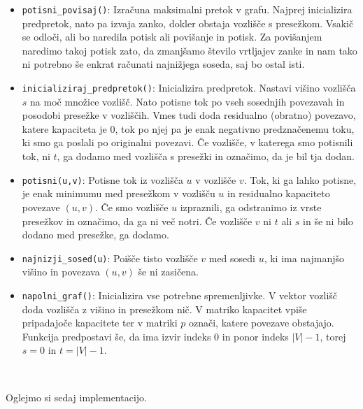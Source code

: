 \documentclass[mat1]{fmfdelo}
\begin{document}
\begin{itemize}
\item \texttt{potisni\_povisaj()}: Izračuna maksimalni pretok v grafu. Najprej inicializira predpretok, nato pa izvaja zanko, dokler obstaja vozlišče s presežkom. Vsakič se odloči, ali bo naredila potisk ali povišanje in potisk. Za povišanjem naredimo takoj potisk zato, da zmanjšamo število vrtljajev zanke in nam tako ni potrebno še enkrat računati najnižjega soseda, saj bo ostal isti.
\item \texttt{inicializiraj\_predpretok()}: Inicializira predpretok. Nastavi višino vozlišča $s$ na moč množice vozlišč. Nato potisne tok po vseh sosednjih povezavah in posodobi presežke v vozliščih. Vmes tudi doda residualno (obratno) povezavo, katere kapaciteta je $0$, tok po njej pa je enak negativno predznačenemu toku, ki smo ga poslali po originalni povezavi. Če vozlišče, v katerega smo potisnili tok, ni $t$, ga dodamo med vozlišča s presežki in označimo, da je bil tja dodan.
\item \texttt{potisni(u,v)}: Potisne tok iz vozlišča $u$ v vozlišče $v$. Tok, ki ga lahko potisne, je enak minimumu med presežkom v vozlišču $u$ in residualno kapaciteto povezave $(u,v)$. Če smo vozlišče $u$ izpraznili, ga odstranimo iz vrste presežkov in označimo, da ga ni več notri. Če vozlišče $v$ ni $t$ ali $s$ in še ni bilo dodano med presežke, ga dodamo.
\item \texttt{najnizji\_sosed(u)}: Poišče tisto vozlišče $v$ med sosedi $u$, ki ima najmanjšo višino in povezava $(u,v)$ še ni zasičena.
\item \texttt{napolni\_graf()}: Inicializira vse potrebne spremenljivke. V vektor vozlišč doda vozlišča z višino in presežkom nič. V matriko kapacitet vpiše pripadajoče kapacitete ter v matriki $p$ označi, katere povezave obstajajo. Funkcija predpostavi še, da ima izvir indeks $0$ in ponor indeks $|V| - 1$, torej $s = 0$ in $t = |V| - 1$.
\end{itemize}~

Oglejmo si sedaj implementacijo.
\end{document}
